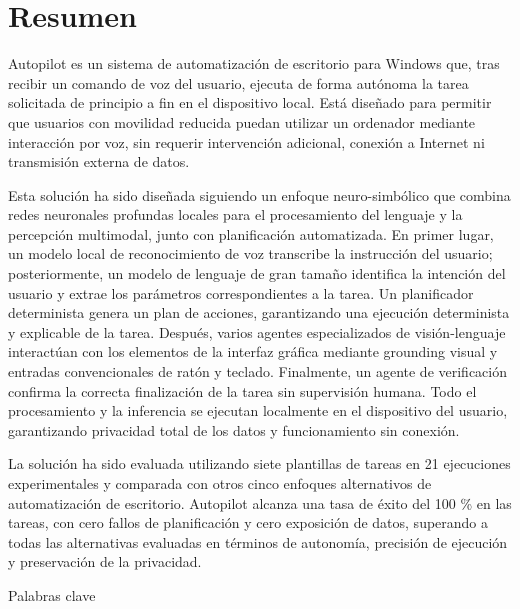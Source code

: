 \chapter*{Resumen}

Autopilot es un sistema de automatización de escritorio para Windows que, tras recibir un comando de voz del usuario, ejecuta de forma autónoma la tarea solicitada de principio a fin en el dispositivo local. Está diseñado para permitir que usuarios con movilidad reducida puedan utilizar un ordenador mediante interacción por voz, sin requerir intervención adicional, conexión a Internet ni transmisión externa de datos.

Esta solución ha sido diseñada siguiendo un enfoque neuro-simbólico que combina redes neuronales profundas locales para el procesamiento del lenguaje y la percepción multimodal, junto con planificación automatizada. En primer lugar, un modelo local de reconocimiento de voz transcribe la instrucción del usuario; posteriormente, un modelo de lenguaje de gran tamaño identifica la intención del usuario y extrae los parámetros correspondientes a la tarea. Un planificador determinista genera un plan de acciones, garantizando una ejecución determinista y explicable de la tarea. Después, varios agentes especializados de visión-lenguaje interactúan con los elementos de la interfaz gráfica mediante grounding visual y entradas convencionales de ratón y teclado. Finalmente, un agente de verificación confirma la correcta finalización de la tarea sin supervisión humana. Todo el procesamiento y la inferencia se ejecutan localmente en el dispositivo del usuario, garantizando privacidad total de los datos y funcionamiento sin conexión.

La solución ha sido evaluada utilizando siete plantillas de tareas en 21 ejecuciones experimentales y comparada con otros cinco enfoques alternativos de automatización de escritorio. Autopilot alcanza una tasa de éxito del 100 \% en las tareas, con cero fallos de planificación y cero exposición de datos, superando a todas las alternativas evaluadas en términos de autonomía, precisión de ejecución y preservación de la privacidad.

\begin{keywords}{Palabras clave}
  \mykeywordses{}
\end{keywords}
